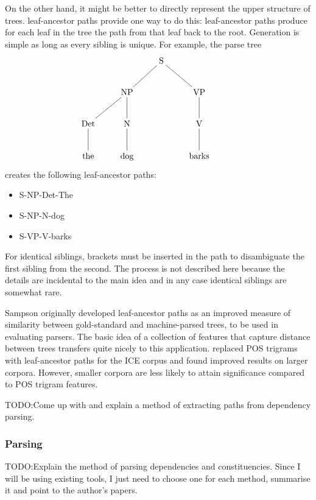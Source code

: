 \documentclass[11pt]{article}
\begin{document}
On the other hand, it might be better to directly represent the upper
structure of trees.  leaf-ancestor paths provide
one way to do this: leaf-ancestor paths produce for each leaf in the
tree the path from that leaf back to the root. Generation is
simple as long as every sibling is unique. For example, the parse tree
\[\xymatrix{
  &&\textrm{S} \ar@{-}[dl] \ar@{-}[dr] &&\\
  &\textrm{NP} \ar@{-}[d] \ar@{-}[dl] &&\textrm{VP} \ar@{-}[d]\\
  \textrm{Det} \ar@{-}[d] & \textrm{N} \ar@{-}[d] && \textrm{V} \ar@{-}[d] \\
\textrm{the}& \textrm{dog} && \textrm{barks}\\}
\]
creates the following leaf-ancestor paths:

\begin{itemize}
\item S-NP-Det-The
\item S-NP-N-dog
\item S-VP-V-barks
\end{itemize}

For identical siblings, brackets must be inserted in the path to
disambiguate the first sibling from the second. The process is not
described here because the details are incidental to the main idea and
in any case identical siblings are somewhat rare.

Sampson originally developed leaf-ancestor paths as an improved
measure of similarity between gold-standard and machine-parsed trees,
to be used in evaluating parsers. The basic idea of a collection of
features that capture distance between trees transfers quite nicely to
this application.  replaced POS trigrams with
leaf-ancestor paths for the ICE corpus and found improved results on
larger corpora. However, smaller corpora are less likely to attain
significance compared to POS trigram features.


TODO:Come up with and explain a method of extracting paths from
dependency parsing.

\subsubsection{Parsing}

TODO:Explain the method of parsing dependencies and
constituencies. Since I will be using existing tools, I just need to
choose one for each method, summarise it and point to the author's
papers.
\end{document}

